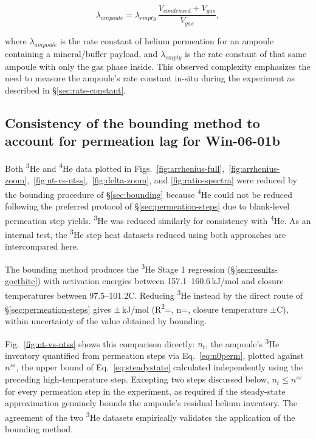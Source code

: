 \begin{equation}
\label{eq:keff}
\lambda_{ampoule} = \lambda_{empty}\,\frac{V_{condensed} + V_{gas}}{V_{gas}} ,
\end{equation}

where $\lambda_{ampoule}$ is the rate constant of helium permeation for an ampoule containing a mineral/buffer payload, and $\lambda_{empty}$ is the rate constant of that same ampoule with only the gas phase inside. This observed complexity emphasizes the need to measure the ampoule's rate constant in-situ during the experiment as described in \S\ref{sec:rate-constant}. 

\subsection{Consistency of the bounding method to account for permeation lag for Win-06-01b}\label{sec:discussion-bounding-direct}

Both \textsuperscript{3}He and \textsuperscript{4}He data plotted in Figs.~\ref{fig:arrhenius-full},~\ref{fig:arrhenius-zoom},~\ref{fig:nt-vs-ntss},~\ref{fig:delta-zoom}, and \ref{fig:ratio-spectra} were reduced by the bounding procedure of \S\ref{sec:bounding} because \textsuperscript{4}He could not be reduced following the preferred protocol of \S\ref{sec:permeation-steps} due to blank-level permeation step yields. \textsuperscript{3}He was reduced similarly for consistency with \textsuperscript{4}He. As an internal test, the \textsuperscript{3}He step heat datasets reduced using both approaches are intercompared here.

The bounding method produces the \textsuperscript{3}He Stage 1 regression (\S\ref{sec:results-goethite}) with activation energies between 157.1--160.6\,kJ/mol and closure temperatures between 97.5--101.2\textdegree C.
Reducing \textsuperscript{3}He instead by the direct route of \S\ref{sec:permeation-steps} gives \ChTwoBracketEa$\pm$\ChTwoBracketEaErr\,kJ/mol (R\textsuperscript{2}=\ChTwoBracketRtwo, n=\ChTwoBracketN, closure temperature \ChTwoBracketTc$\pm$\ChTwoBracketTcErr\textdegree C), within uncertainty of the value obtained by bounding. 

Fig.~\ref{fig:nt-vs-ntss} shows this comparison directly: $n_t$, the ampoule's \textsuperscript{3}He inventory quantified from permeation steps via Eq.~\eqref{eq:n0perm}, plotted against $n^{ss}$, the upper bound of Eq.~\eqref{eq:steadystate} calculated independently using the preceding high-temperature step. Excepting two steps discussed below, $n_t \leq n^{ss}$ for every permeation step in the experiment, as required if the steady-state approximation genuinely bounds the ampoule's residual helium inventory. The agreement of the two \textsuperscript{3}He datasets empirically validates the application of the bounding method. 

